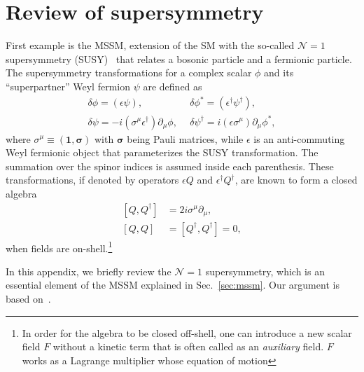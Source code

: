 \documentclass[12pt,twoside,book]{article}
\begin{document}
\section{Review of supersymmetry}
\label{sec:susy}

\vskip 0.1in


First example is the MSSM, extension of the SM with the so-called
$\mathcal{N}=1$ supersymmetry (SUSY)~\cite{Wess:320631, Martin:1997ns}
that relates a bosonic particle and a fermionic particle.  The
supersymmetry transformations for a complex scalar $\phi$ and its
``superpartner'' Weyl fermion $\psi$ are defined as
\begin{align}
 \delta \phi = \left( \epsilon \psi \right),
 ~&~
 \delta \phi^{*} = \left( \epsilon^\dagger \psi^\dagger \right),\\
 \delta \psi = -i \left(\sigma^\mu \epsilon^\dagger \right) \partial_\mu \phi,
 ~&~
 \delta \psi^\dagger = i \left(\epsilon \sigma^\mu \right) \partial_\mu \phi^{*},
\end{align}
where $\sigma^\mu \equiv (\bm{1}, \bm{\sigma})$ with $\bm{\sigma}$
being Pauli matrices, while $\epsilon$ is an anti-commuting Weyl
fermionic object that parameterizes the SUSY transformation.  The
summation over the spinor indices is assumed inside each parenthesis.
These transformations, if denoted by operators $\epsilon Q$ and
$\epsilon^\dagger Q^\dagger$, are known to form a closed algebra
\begin{align}
 \left[ Q, Q^\dagger \right] &= 2 i \sigma^\mu \partial_\mu,\\
 \left[ Q, Q \right] &= \left[ Q^\dagger, Q^\dagger \right] = 0,
\end{align}
when fields are on-shell.\footnote{
  In order for the algebra to be closed off-shell, one can introduce a new scalar field $F$ without a kinetic term that is often called as an \textit{auxiliary} field.
  $F$ works as a Lagrange multiplier whose equation of motion 
}




In this appendix, we briefly review the $\mathcal{N}=1$ supersymmetry, which is an essential element of the MSSM explained in Sec.~\ref{sec:mssm}.
Our argument is based on~\cite{Wess:320631, Martin:1997ns}.
\end{document}
